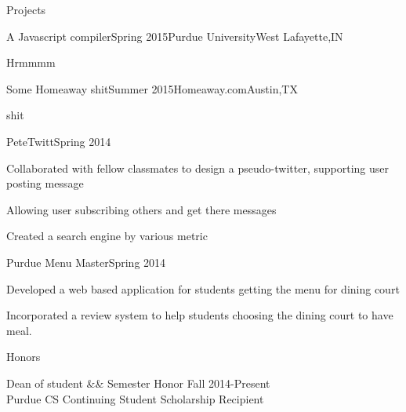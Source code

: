 \documentclass{resume} %
\begin{document}
\begin{rSection}{Projects}

\begin{rSubsection}{A Javascript compiler}{Spring 2015}{Purdue University}{West Lafayette,IN}
\item Hrmmmm
\end{rSubsection}

\begin{rSubsection}{Some Homeaway shit}{Summer 2015}{Homeaway.com}{Austin,TX}
\item shit
\end{rSubsection}

\begin{rSubsection}{PeteTwitt}{Spring 2014}{}{}
\item Collaborated with fellow classmates to design a pseudo-twitter, supporting user posting message
\item Allowing user subscribing others and get there messages
\item Created a search engine by various metric
\end{rSubsection}

\begin{rSubsection}{Purdue Menu Master}{Spring 2014}{}{}
\item Developed a web based application for students getting the menu for dining court
\item Incorporated a review system to help students choosing the dining court to have meal.
\end{rSubsection}




\end{rSection}

\begin{rSection}{Honors}{}{}


Dean of student \&\& Semester Honor  \hspace{100mm} Fall  2014-Present\\ 
Purdue CS Continuing Student Scholarship Recipient 


\end{rSection}

\end{document}
